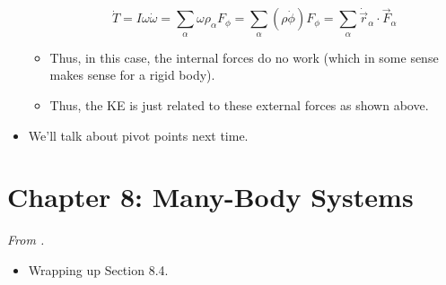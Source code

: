 \documentclass[../notes.tex]{subfiles}
\begin{document}
\begin{itemize}
\begin{itemize}
\begin{equation*}
            \dot{T} = I\omega\dot{\omega}
            = \sum_\alpha\omega\rho_\alpha F_\phi
            = \sum_\alpha(\rho\dot{\phi})F_\phi
            = \sum_\alpha\dot{\vec{r}}_\alpha\cdot\vec{F}_\alpha
        \end{equation*}
        \item Thus, in this case, the internal forces do no work (which in some sense makes sense for a rigid body).
        \item Thus, the KE is just related to these external forces as shown above.
    \end{itemize}
    \item We'll talk about pivot points next time.
\end{itemize}



\section{Chapter 8: Many-Body Systems}
\emph{From \textcite{bib:KibbleBerkshire}.}
\begin{itemize}
    \item Wrapping up Section 8.4.
\end{itemize}
\end{document}
